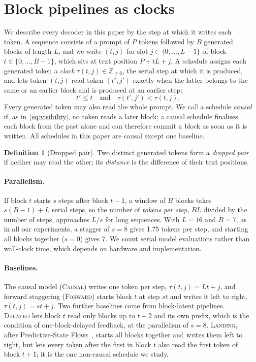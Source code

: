\documentclass{article}
\theoremstyle{definition}
\newtheorem{definition}{Definition}
\theoremstyle{remark}
\newcommand{\name}[1]{\textup{\textsc{#1}}}
\newcommand{\fwd}{\name{Forward}\xspace}
\newcommand{\causal}{\name{Causal}\xspace}
\newcommand{\delayed}{\name{Delayed}\xspace}
\newcommand{\landing}{\name{Landing}\xspace}
\begin{document}
\section{Block pipelines as clocks}
\label{sec:setup}

We describe every decoder in this paper by the step at which it writes each token.
A sequence consists of a prompt of $P$ tokens followed by $B$ generated blocks of length $L$, and we write $(t,j)$ for slot $j\in\{0,\dots,L-1\}$ of block $t\in\{0,\dots,B-1\}$, which sits at text position $P+tL+j$.
A schedule assigns each generated token a \emph{clock} $\tau(t,j)\in\mathbb{Z}_{\ge 0}$, the serial step at which it is produced, and lets token $(t,j)$ read token $(t',j')$ exactly when the latter belongs to the same or an earlier block and is produced at an earlier step:
\begin{equation}
  t'\le t \quad\text{and}\quad \tau(t',j')<\tau(t,j).
  \label{eq:visibility}
\end{equation}
Every generated token may also read the whole prompt.
We call a schedule \emph{causal} if, as in~\eqref{eq:visibility}, no token reads a later block; a causal schedule finalises each block from the past alone and can therefore commit a block as soon as it is written.
All schedules in this paper are causal except one baseline.

\begin{definition}[Dropped pair]
Two distinct generated tokens form a \emph{dropped pair} if neither may read the other; its \emph{distance} is the difference of their text positions.
\end{definition}

\paragraph{Parallelism.}
If block $t$ starts $s$ steps after block $t-1$, a window of $B$ blocks takes $s(B-1)+L$ serial steps, so the number of \emph{tokens per step}, $BL$ divided by the number of steps, approaches $L/s$ for long sequences.
With $L=16$ and $B=7$, as in all our experiments, a stagger of $s=8$ gives 1.75 tokens per step, and starting all blocks together ($s=0$) gives 7.
We count serial model evaluations rather than wall-clock time, which depends on hardware and implementation.

\paragraph{Baselines.}
The causal model (\causal) writes one token per step, $\tau(t,j)=Lt+j$, and forward staggering (\fwd) starts block $t$ at step $st$ and writes it left to right, $\tau(t,j)=st+j$.
Two further baselines come from block-latent pipelines.
\delayed lets block $t$ read only blocks up to $t-2$ and its own prefix, which is the condition of one-block-delayed feedback, at the parallelism of $s=8$.
\landing, after Predictive-State Flows~\citep{he2026psf}, starts all blocks together and writes them left to right, but lets every token after the first in block $t$ also read the first token of block $t+1$; it is the one non-causal schedule we study.
\end{document}
